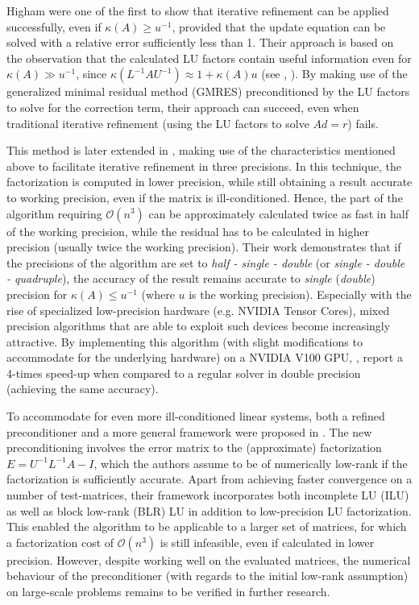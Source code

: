 Higham \cite{carson_new_2017} were one of the first to show that iterative refinement can be applied successfully, even if $\kappa(A) \geq u^{-1}$, provided that the update equation can be solved with a relative error sufficiently less than 1. Their approach is based on the observation that the calculated LU factors contain useful information even for $\kappa(A) \gg u^{-1}$, since $\kappa(L^{-1}AU^{-1}) \approx 1+\kappa(A)u$ (see \cite{rump_approximate_1990}, \cite{rump_inversion_2009}). By making use of the generalized minimal residual method (GMRES) \cite{saad_gmres_1986} preconditioned by the LU factors to solve for the correction term, their approach can succeed, even when traditional iterative refinement (using the LU factors to solve $Ad=r$) fails.

This method is later extended in \cite{carson_accelerating_2018}, making use of the characteristics mentioned above to facilitate iterative refinement in three precisions. In this technique, the factorization is computed in lower precision, while still obtaining a result accurate to working precision, even if the matrix is ill-conditioned. Hence, the part of the algorithm requiring $\mathcal{O}(n^3)$ can be approximately calculated twice as fast in half of the working precision, while the residual has to be calculated in higher precision (usually twice the working precision). Their work demonstrates that if the precisions of the algorithm are set to \textit{half - single - double} (or \textit{single - double - quadruple}), the accuracy of the result remains accurate to \textit{single} (\textit{double}) precision for $\kappa(A) \leq u^{-1}$ (where $u$ is the working precision). Especially with the rise of specialized low-precision hardware (e.g. NVIDIA Tensor Cores), mixed precision algorithms that are able to exploit such devices become increasingly attractive. By implementing this algorithm (with slight modifications to accommodate for the underlying hardware) on a NVIDIA V100 GPU, \cite{haidar_harnessing_2018}, report a 4-times speed-up when compared to a regular solver in double precision (achieving the same accuracy).

To accommodate for even more ill-conditioned linear systems, both a refined preconditioner and a more general framework were proposed in \cite{higham_new_2019}. The new preconditioning involves the error matrix to the (approximate) factorization $E=U^{-1}L^{-1}A - I$, which the authors assume to be of numerically low-rank if the factorization is sufficiently accurate. Apart from achieving faster convergence on a number of test-matrices, their framework incorporates both incomplete LU (ILU) \cite{saad_iterative_2003} as well as block low-rank (BLR) LU \cite{amestoy_improving_2015} in addition to low-precision LU factorization. This enabled the algorithm to be applicable to a larger set of matrices, for which a factorization cost of $\mathcal{O}(n^3)$ is still infeasible, even if calculated in lower precision. However, despite working well on the evaluated matrices, the numerical behaviour of the preconditioner (with regards to the initial low-rank assumption) on large-scale problems remains to be verified in further research.



